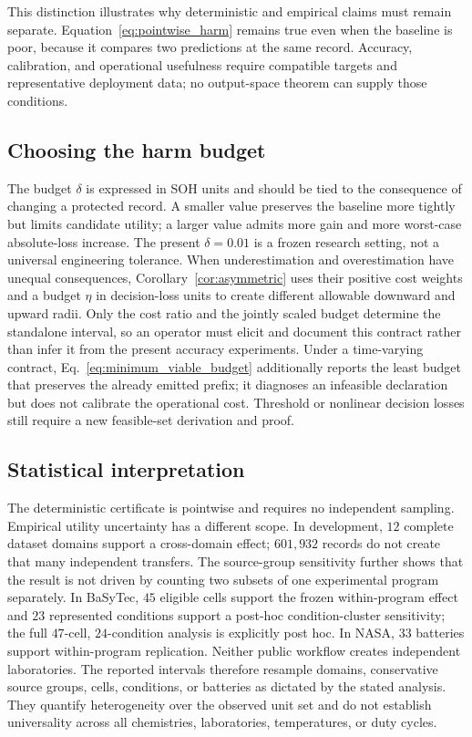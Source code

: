 \documentclass[11pt]{article}
\begin{document}
This distinction illustrates why deterministic and empirical claims must remain separate. Equation~\eqref{eq:pointwise_harm} remains true even when the baseline is poor, because it compares two predictions at the same record. Accuracy, calibration, and operational usefulness require compatible targets and representative deployment data; no output-space theorem can supply those conditions.

\subsection{Choosing the harm budget}

The budget $\delta$ is expressed in SOH units and should be tied to the consequence of changing a protected record. A smaller value preserves the baseline more tightly but limits candidate utility; a larger value admits more gain and more worst-case absolute-loss increase. The present $\delta=0.01$ is a frozen research setting, not a universal engineering tolerance. When underestimation and overestimation have unequal consequences, Corollary~\ref{cor:asymmetric} uses their positive cost weights and a budget $\eta$ in decision-loss units to create different allowable downward and upward radii. Only the cost ratio and the jointly scaled budget determine the standalone interval, so an operator must elicit and document this contract rather than infer it from the present accuracy experiments. Under a time-varying contract, Eq.~\eqref{eq:minimum_viable_budget} additionally reports the least budget that preserves the already emitted prefix; it diagnoses an infeasible declaration but does not calibrate the operational cost. Threshold or nonlinear decision losses still require a new feasible-set derivation and proof.

\subsection{Statistical interpretation}

The deterministic certificate is pointwise and requires no independent sampling. Empirical utility uncertainty has a different scope. In development, $12$ complete dataset domains support a cross-domain effect; $601{,}932$ records do not create that many independent transfers. The source-group sensitivity further shows that the result is not driven by counting two subsets of one experimental program separately. In BaSyTec, $45$ eligible cells support the frozen within-program effect and $23$ represented conditions support a post-hoc condition-cluster sensitivity; the full $47$-cell, $24$-condition analysis is explicitly post hoc. In NASA, $33$ batteries support within-program replication. Neither public workflow creates independent laboratories. The reported intervals therefore resample domains, conservative source groups, cells, conditions, or batteries as dictated by the stated analysis. They quantify heterogeneity over the observed unit set and do not establish universality across all chemistries, laboratories, temperatures, or duty cycles.
\end{document}
